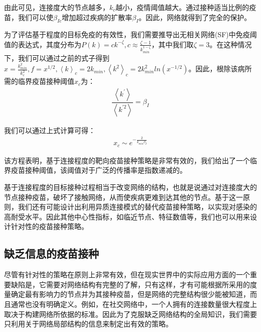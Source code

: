 \documentclass[UTF8]{ctexart}
\begin{document}
\par 由此可见，连接度大的节点越多，$k_{c}$越小，疫情阈值越大。通过接种适当比例的疫苗，我们可以使$\beta_{Ic}$增加超过疾病的扩散率$\beta_{I}$。因此，网络就得到了完全的保护。
\par 为了评估基于程度的目标免疫的有效性，我们需要推导出无相关网络(SF)中免疫阈值的表达式，其度分布为$P(k)=ck^{-\zeta},c\approx\frac{\zeta-1}{k_{min}^{1-\zeta}}$，其中我们取$\zeta=3$。在这种情况下，我们可以通过之前的式子得到$x=\frac{k_{min}^{2}}{k_{c}^{2}}, f=x^{1/2}, \left\langle k\right\rangle_{c}=2k_{min}, \left\langle k^{2}\right\rangle_{c}= 2k_{min}^{2}ln(x^{-1/2})$。因此，根除该病所需的临界疫苗接种阈值$x_{c}$为：
\begin{equation}
	\begin{aligned}
		\dfrac{\left\langle k^{\prime}\right\rangle}{\left\langle k^{\prime2}\right\rangle}=\beta_{I}
	\end{aligned}
\end{equation}
\par 我们可以通过上式计算可得：
\begin{equation}
	\begin{aligned}
		x_{c}\sim e^{-\frac{2}{k_{min}\beta_{I}}}
	\end{aligned}
\end{equation}
\par 该方程表明，基于连接程度的靶向疫苗接种策略是非常有效的，我们给出了一个临界疫苗接种阈值，该阈值对于广泛的传播率是指数递减的。
\par 基于连接程度的目标接种过程相当于改变网络的结构，也就是说通过对连接度大的节点接种疫苗，破坏了接触网络，从而使疾病更难到达其他的节点。基于这一原则，我们还有可能设计出利用异质连接模式的替代疫苗接种策略，以实现对感染的高耐受水平。因此其他中心性指标，如临近节点、特征数值等，我们也可以用来设计针对性的疫苗接种策略。
\subsection{缺乏信息的疫苗接种}
尽管有针对性的策略在原则上非常有效，但在现实世界中的实际应用方面的一个重要缺陷是，它需要对网络结构有完整的了解，只有这样，才有可能根据所采用的度量确定最有影响力的节点并为其接种疫苗，但是网络的完整结构很少能被知道，而且通常也没有明确定义。例如，在社交网络中，一个人拥有的连接数量很大程度上取决于构建网络所依据的标准。因此为了克服缺乏网络结构的全局知识，我们需要只利用关于网络局部结构的信息来制定出有效的策略。
\end{document}
